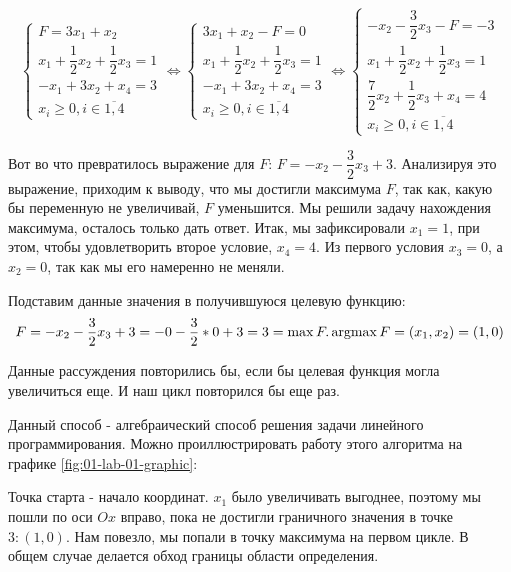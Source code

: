 \[
    \begin{cases}
        F = 3x_1 + x_2\\
        x_1 + \dfrac{1}{2}x_2 + \dfrac{1}{2}x_3 = 1\\ 
        -x_1 + 3x_2 + x_4 = 3\\
        x_{i} \geq 0, i\in\overline{1,4}
    \end{cases}
    \Leftrightarrow
    \begin{cases}
        3x_1 + x_2 - F = 0\\
        x_1 + \dfrac{1}{2}x_2 + \dfrac{1}{2}x_3 = 1\\
        -x_1 + 3x_2 + x_4 = 3\\
        x_{i} \geq 0, i\in\overline{1,4}
    \end{cases}
    \Leftrightarrow
    \begin{cases}
        -x_2 - \dfrac{3}{2}x_3 - F = -3\\
        x_1 + \dfrac{1}{2}x_2 + \dfrac{1}{2}x_3 = 1\\
        \dfrac{7}{2}x_2 + \dfrac{1}{2}x_3 + x_4 = 4\\
        x_{i} \geq 0, i\in\overline{1,4}
    \end{cases}
\]

Вот во что превратилось выражение для $F$: $F = -x_2 - \dfrac{3}{2}x_3 + 3$. Анализируя это выражение, приходим к выводу, что
мы достигли максимума $F$, так как, какую бы переменную не увеличивай, $F$ уменьшится. Мы решили задачу нахождения максимума, осталось только дать ответ.
Итак, мы зафиксировали $x_1 = 1$, при этом, чтобы удовлетворить второе условие, $x_4 = 4$. Из первого условия $x_3 = 0$, а $x_2 = 0$, так как мы его намеренно не меняли.

Подставим данные значения в получившуюся целевую функцию: 
$$F = -x_2 - \dfrac{3}{2}x_3 + 3 = -0 - \dfrac{3}{2} * 0 + 3 = 3 = \max F.\\ \operatorname*{argmax} F = (x_1, x_2) = (1, 0)$$

Данные рассуждения повторились бы, если бы целевая функция могла увеличиться еще. И наш цикл повторился бы еще раз.

Данный способ - алгебраический способ решения задачи линейного программирования. Можно проиллюстрировать работу этого алгоритма на графике \ref{fig:01-lab-01-graphic}:

Точка старта - начало координат. $x_1$ было увеличивать выгоднее, поэтому мы пошли по оси $Ox$ вправо, пока не достигли
граничного значения в точке $3:(1, 0)$. Нам повезло, мы попали в точку максимума на первом цикле. В общем случае делается обход границы области определения.

